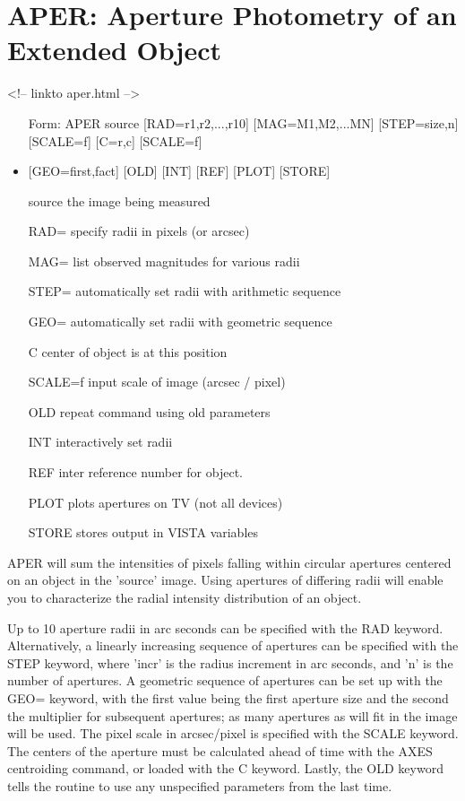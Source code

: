 \section{APER: Aperture Photometry of an Extended Object}
\begin{rawhtml}
<!-- linkto aper.html -->
\end{rawhtml}
\begin{itemize}
  \item[Form: APER source {[RAD=r1,r2,...,r10]} {[MAG=M1,M2,...MN]} 
       {[STEP=size,n]} {[SCALE=f]} {[C=r,c]} {[SCALE=f]}\hfill]{}
  \item{{[GEO=first,fact]} {[OLD]} {[INT]} {[REF]} {[PLOT]} {[STORE]}}
  \item[source]{the image being measured}
  \item[RAD=]{specify radii in pixels (or arcsec)}
  \item[MAG=]{list observed magnitudes for various radii}
  \item[STEP=]{automatically set radii with arithmetic sequence}
  \item[GEO=]{automatically set radii with geometric sequence}
  \item[C]{center of object is at this position}
  \item[SCALE=f]{input scale of image (arcsec / pixel)}
  \item[OLD]{repeat command using old parameters}
  \item[INT]{interactively set radii}
  \item[REF]{inter reference number for object.}
  \item[PLOT]{plots apertures on TV (not all devices)}
  \item[STORE]{stores output in VISTA variables}
\end{itemize}

APER will sum the intensities of pixels falling within circular apertures
centered on an object in the 'source' image.  Using apertures of differing
radii will enable you to characterize the radial intensity distribution of
an object.

Up to 10 aperture radii in arc seconds can be specified with the RAD
keyword. Alternatively, a linearly increasing sequence of apertures can be
specified with the STEP keyword, where 'incr' is the radius increment in
arc seconds, and 'n' is the number of apertures.  A geometric sequence of
apertures can be set up with the GEO= keyword, with the first value being
the first aperture size and the second the multiplier for subsequent
apertures; as many apertures as will fit in the image will be used.  The
pixel scale in arcsec/pixel is specified with the SCALE keyword.  The
centers of the aperture must be calculated ahead of time with the AXES
centroiding command, or loaded with the C keyword. Lastly, the OLD keyword
tells the routine to use any unspecified parameters from the last time.

